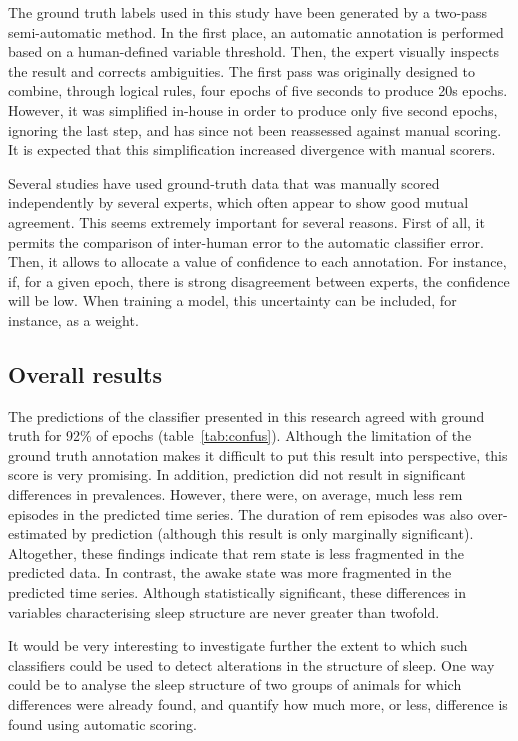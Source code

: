 The ground truth labels used in this study have been generated by a two-pass semi-automatic method.
In the first place, an automatic annotation is performed based on a human-defined variable threshold.
Then, the expert visually inspects the result and corrects ambiguities.
The first pass was originally designed to combine, through logical rules, four
epochs of five seconds to produce 20s
epochs\cite{costa-miserachs_automated_2003}.
However, it was simplified in-house in order to produce
only five second epochs, ignoring the last step, and has since not been reassessed against manual scoring.
It is expected that this simplification increased divergence with manual scorers.

Several studies have used ground-truth data that was manually scored independently by several experts,
which often appear to show good mutual agreement.
This seems extremely important for several reasons.
First of all, it permits the comparison of inter-human error to the automatic classifier error.
Then, it allows to allocate a value of confidence to each annotation.
For instance, if, for a given epoch, there is strong disagreement between experts, the confidence will be low.
When training a model, this uncertainty can be included, for instance, as a weight.

\subsection{Overall results}
The predictions of the classifier presented in this research agreed with ground truth for 92\% of epochs (table~\ref{tab:confus}).
Although the limitation of the ground truth annotation makes it difficult to
put this result into perspective, this score is very promising.
In addition, prediction did not result in significant differences in prevalences.
However, there were, on average, much less \gls{rem} episodes in the predicted time series.
The duration of \gls{rem} episodes was also over-estimated by prediction (although this result is only marginally significant).
Altogether, these findings indicate that \gls{rem} state is less fragmented in the predicted data.
In contrast, the awake state was more fragmented in the predicted time series.
Although statistically significant, these differences in variables characterising sleep structure are never greater than twofold.

It would be very interesting to investigate further the extent to which such classifiers could be used to detect alterations
in the structure of sleep.
One way could be to analyse the sleep structure of two groups of animals for which differences were already found, and quantify how much more, or less,
difference is found using automatic scoring.


